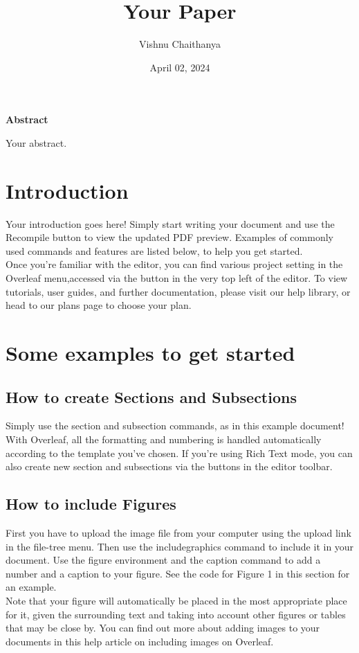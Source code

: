 \documentclass{article}
\title{Your Paper}
\author{Vishnu Chaithanya}
\date{April 02, 2024}
\begin{document}
	
	\maketitle
	\begin{center}
		\textbf{Abstract}
	\end{center}
	Your abstract.
	
	\section{Introduction}
	Your introduction goes here! Simply start writing your document and use the Recompile button to
	view the updated PDF preview. Examples of commonly used commands and features are listed below,
	to help you get started.\\
    \indent Once you’re familiar with the editor, you can find various project setting in the Overleaf menu,accessed via the button in the very top left of the editor. To view tutorials, user guides, and further documentation, please visit our help library, or head to our plans page to choose your plan.
    
    \section{Some examples to get started}
    \subsection{How to create Sections and Subsections}
    Simply use the section and subsection commands, as in this example document! With Overleaf, all
    the formatting and numbering is handled automatically according to the template you’ve chosen. If you’re using Rich Text mode, you can also create new section and subsections via the buttons in the editor toolbar.
    \subsection{How to include Figures}
    First you have to upload the image file from your computer using the upload link in the file-tree menu. Then use the includegraphics command to include it in your document. Use the figure environment and the caption command to add a number and a caption to your figure. See the code for Figure 1 in this section for an example.\\ 
    \indent Note that your figure will automatically be placed in the most appropriate place for it, given the
    surrounding text and taking into account other figures or tables that may be close by. You can find out more about adding images to your documents in this help article on including images on Overleaf.
    
\end{document}
